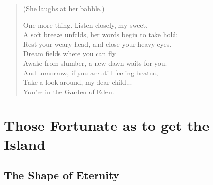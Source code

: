\documentclass[12pt]{amsart}
\begin{document}
\begin{verse}
(She laughs at her babble.)

One more thing. Listen closely, my sweet.\\
A soft breeze unfolds, her words begin to take hold:\\
Rest your weary head, and close your heavy eyes.\\
Dream fields where you can fly.\\
Awake from slumber, a new dawn waits for you.\\
And tomorrow, if you are still feeling beaten,\\
Take a look around, my dear child...\\
You’re in the Garden of Eden.
\end{verse}

\newpage

\section*{Those Fortunate as to get the Island}
\subsection*{The Shape of Eternity}
\end{document}

